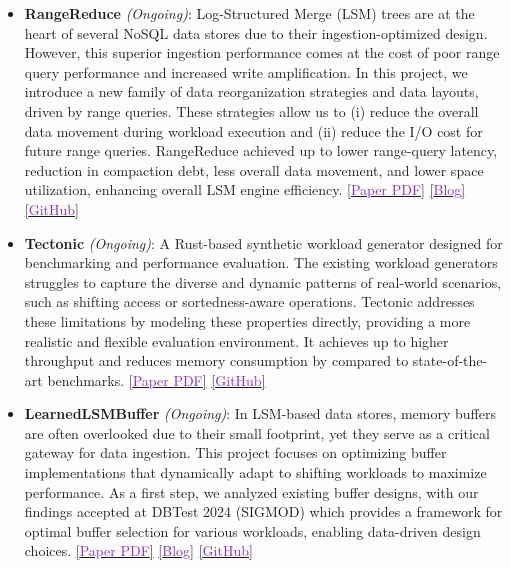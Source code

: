 \begin{itemize}[topsep=0pt, itemsep=0.35em, parsep=0.5pt]
  \item \textbf{RangeReduce} \textit{(Ongoing)}:
  Log-Structured Merge (LSM) trees are at the heart of several NoSQL data stores due to their ingestion-optimized design.
  However, this superior ingestion performance comes at the cost of poor range query performance and increased write amplification.
  In this project, we introduce a new family of data reorganization strategies and data layouts, driven by range queries.
  These strategies allow us to (i) reduce the overall data movement during workload execution and (ii) reduce the I/O cost for future range queries.
  RangeReduce achieved up to  lower range-query latency,  reduction in compaction debt,  less overall data movement, and  lower space utilization, enhancing overall LSM engine efficiency.
  \href{https://shubhamkaushik.com/assets/pdf/RangeReduce.pdf}{[\textcolor{blueviolet}{Paper PDF}]} \href{https://shubhamkaushik.com/projects/designing_range_query_aware_log_structured_merge_tree/}{[\textcolor{blueviolet}{Blog}]} \href{https://github.com/SSD-Brandeis/LSMQueryDrivenCompaction}{[\textcolor{blueviolet}{GitHub}]}

  \item \textbf{Tectonic} \textit{(Ongoing)}: 
  A Rust-based synthetic workload generator designed for benchmarking and performance evaluation. 
  The existing workload generators struggles to capture the diverse and dynamic patterns of real-world scenarios, such as shifting access or sortedness-aware operations.
  Tectonic addresses these limitations by modeling these properties directly, providing a more realistic and flexible evaluation environment. 
  It achieves up to \underbar{$2\times$} higher throughput and reduces memory consumption by  compared to state-of-the-art benchmarks.
  \href{https://shubhamkaushik.com/projects/assets/pdf/Tectonic.pdf}{[\textcolor{blueviolet}{Paper PDF}]} \href{https://github.com/SSD-Brandeis/tectonic}{[\textcolor{blueviolet}{GitHub}]}

  \item \textbf{LearnedLSMBuffer} \textit{(Ongoing)}: 
  In LSM-based data stores, memory buffers are often overlooked due to their small footprint, yet they serve as a critical gateway for data ingestion.
  This project focuses on optimizing buffer implementations that dynamically adapt to shifting workloads to maximize performance.
  As a first step, we analyzed existing buffer designs, with our findings accepted at DBTest 2024 (SIGMOD) which provides a framework for optimal buffer selection for various workloads, enabling data-driven design choices.
  \href{https://shubhamkaushik.com/assets/pdf/LSMMemory.pdf}{[\textcolor{blueviolet}{Paper PDF}]} \href{https://shubhamkaushik.com/projects/lsm_memory_buffer/}{[\textcolor{blueviolet}{Blog}]} \href{https://github.com/SSD-Brandeis/LSMMemoryProfiling}{[\textcolor{blueviolet}{GitHub}]}


\end{itemize}
